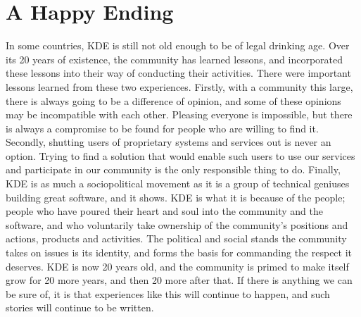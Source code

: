 \section*{A Happy Ending}
In some countries, KDE is still not old enough to be of legal drinking age. Over its 20 years of existence, the community has learned lessons, and incorporated these lessons into their way of conducting their activities. There were important lessons learned from these two experiences.
Firstly, with a community this large, there is always going to be a difference of opinion, and some of these opinions may be incompatible with each other. Pleasing everyone is impossible, but there is always a compromise to be found for people who are willing to find it.
Secondly, shutting users of proprietary systems and services out is never an option. Trying to find a solution that would enable such users to use our services and participate in our community is the only responsible thing to do.
Finally, KDE is as much a sociopolitical movement as it is a group of technical geniuses building great software, and it shows. KDE is what it is because of the people; people who have poured their heart and soul into the community and the software, and who voluntarily take ownership of the community's positions and actions, products and activities. The political and social stands the community takes on issues is its identity, and forms the basis for commanding the respect it deserves.
KDE is now 20 years old, and the community is primed to make itself grow for 20 more years, and then 20 more after that. If there is anything we can be sure of, it is that experiences like this will continue to happen, and such stories will continue to be written.
